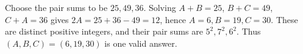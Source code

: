 Choose the pair sums to be $25,49,36$. Solving $A+B=25$, $B+C=49$, $C+A=36$ gives $2A=25+36-49=12$, hence $A=6,B=19,C=30$. These are distinct positive integers, and their pair sums are $5^2,7^2,6^2$. Thus $\boxed{(A,B,C)=(6,19,30)}$ is one valid answer.
